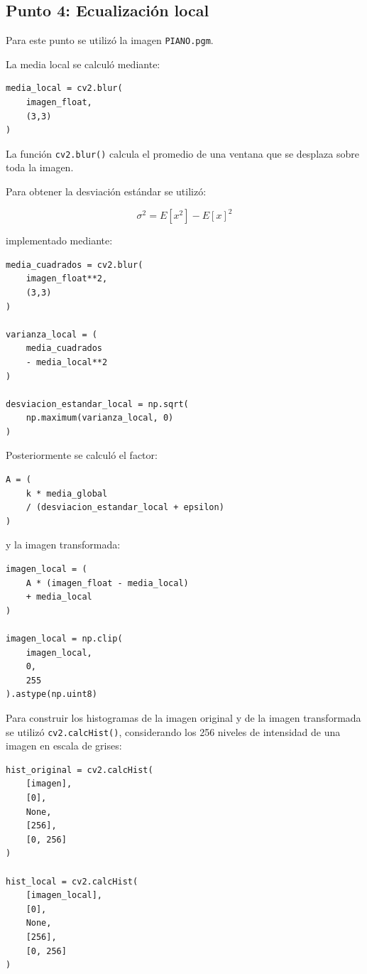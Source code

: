 \documentclass[11pt,letterpaper]{article}
\begin{document}
\subsection{Punto 4: Ecualización local}

Para este punto se utilizó la imagen \texttt{PIANO.pgm}.

La media local se calculó mediante:

\begin{lstlisting}
media_local = cv2.blur(
    imagen_float,
    (3,3)
)
\end{lstlisting}

La función \texttt{cv2.blur()} calcula el promedio de una ventana que se desplaza sobre toda la imagen.

Para obtener la desviación estándar se utilizó:

\[
\sigma^2
=
E[x^2]-E[x]^2
\]

implementado mediante:

\begin{lstlisting}
media_cuadrados = cv2.blur(
    imagen_float**2,
    (3,3)
)

varianza_local = (
    media_cuadrados
    - media_local**2
)

desviacion_estandar_local = np.sqrt(
    np.maximum(varianza_local, 0)
)
\end{lstlisting}

Posteriormente se calculó el factor:

\begin{lstlisting}
A = (
    k * media_global
    / (desviacion_estandar_local + epsilon)
)
\end{lstlisting}

y la imagen transformada:

\begin{lstlisting}
imagen_local = (
    A * (imagen_float - media_local)
    + media_local
)

imagen_local = np.clip(
    imagen_local,
    0,
    255
).astype(np.uint8)
\end{lstlisting}

Para construir los histogramas de la imagen original y de la imagen
transformada se utilizó \texttt{cv2.calcHist()}, considerando los 256
niveles de intensidad de una imagen en escala de grises:

\begin{lstlisting}
hist_original = cv2.calcHist(
    [imagen],
    [0],
    None,
    [256],
    [0, 256]
)

hist_local = cv2.calcHist(
    [imagen_local],
    [0],
    None,
    [256],
    [0, 256]
)
\end{lstlisting}
\end{document}
